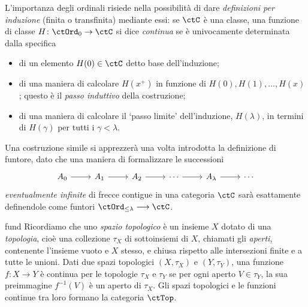 \begin{remark}\label{es_catena_trans}
 L'importanza degli ordinali risiede nella possibilità di dare \emph{definizioni per induzione} (finita o transfinita) mediante essi: se \(\ctC\) è una classe, una funzione di classe \(H \colon \ctOrd_0\to\ctC\) si dice \emph{continua} se è univocamente determinata dalla specifica
 \begin{itemize}
  \item di un elemento \(H(0)\in\ctC\) detto base dell'induzione;
  \item di una maniera di calcolare \(H(x^+)\) in funzione di \(H(0), H(1),\dots,H(x)\); questo è il \emph{passo induttivo} della costruzione;
  \item di una maniera di calcolare il `passo limite' dell'induzione, \(H(\lambda)\), in termini di \(H(\gamma)\) per tutti i \(\gamma < \lambda\).
 \end{itemize}
 Una costruzione simile si apprezzerà una volta introdotta la definizione di funtore, dato che una maniera di formalizzare le successioni
 \[\begin{tikzcd}
   A_0 \ar[r] & A_1 \ar[r] & A_2 \ar[r] & \cdots \ar[r] & A_\lambda \ar[r] & \cdots
  \end{tikzcd}\]
 \emph{eventualmente infinite} di frecce contigue in una categoria \(\ctC\) sarà esattamente definendole come funtori \(\ctOrd_{\le\lambda}\funto \ctC\).
\end{remark}
\begin{hExample}{fund}\label{ex_cat_top}
 Ricordiamo che uno \emph{spazio topologico} è un insieme \(X\) dotato di una \emph{topologia}, cioè una collezione \(\tau_X\) di sottoinsiemi di \(X\), chiamati gli \emph{aperti}, contenente l'insieme vuoto e \(X\) stesso, e chiusa rispetto alle intersezioni finite e a tutte le unioni.
 Dati due spazi topologici \((X,\tau_X)\) e \((Y,\tau_Y)\), una funzione \(f\colon X\to Y\) è continua per le topologie \(\tau_X\) e \(\tau_Y\) se per ogni aperto \(V\in\tau_Y\), la sua preimmagine \(f^{-1}(V)\) è un aperto di \(\tau_X\).
 Gli spazi topologici e le funzioni continue tra loro formano la categoria \(\ctTop\).
\end{hExample}
